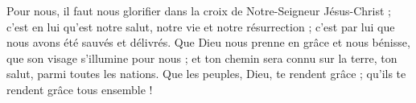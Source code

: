 Pour nous, il faut nous glorifier dans la croix de Notre-Seigneur Jésus-Christ ; c’est en lui qu’est notre salut, notre vie et notre résurrection ; c’est par lui que nous avons été sauvés et délivrés.\versseparator
Que Dieu nous prenne en grâce et nous bénisse, que son visage s'illumine pour nous ;
\versseparator
et ton chemin sera connu sur la terre, ton salut, parmi toutes les nations.
\versseparator
Que les peuples, Dieu, te rendent grâce ; qu'ils te rendent grâce tous ensemble !
